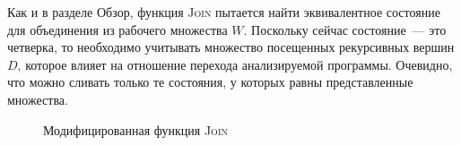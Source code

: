Как и в разделе Обзор, функция \textsc{Join} пытается найти эквивалентное состояние для объединения из рабочего множества $W$. Поскольку сейчас состояние~--- это четверка, то необходимо учитывать множество посещенных рекурсивных вершин $D$, которое влияет на отношение перехода анализируемой программы.
Очевидно, что можно сливать только те состояния, у которых равны представленные множества.

\begin{figure}
\begin{algorithm2e}[H]
    \caption{Модифицированная функция \textsc{Join}}
    \label{algorithm:execute_instruction}
    \small
    \SetAlgoSkip{}

\end{algorithm2e}
\end{figure}



